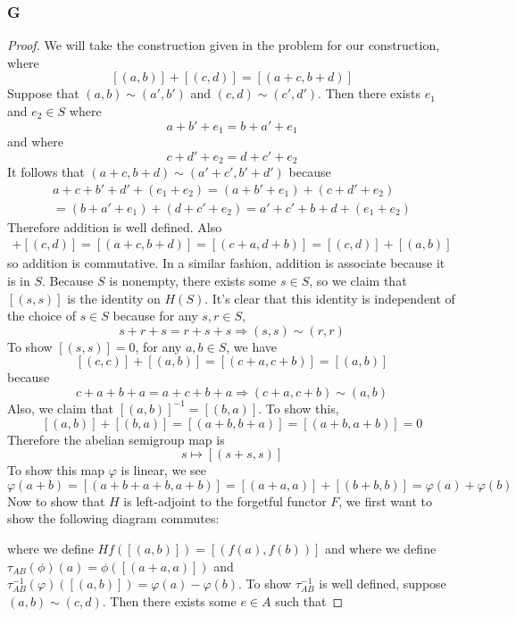 \documentclass{article}
\DeclareMathOperator{\Hom}{Hom}
\DeclareMathOperator{\Mor}{Mor}
\begin{document}
\subsubsection{G}\label{1.5.G}
\begin{proof}
    We will take the construction given in the problem for our construction, where
    \[
    [(a,b)]+[(c,d)]=[(a+c,b+d)]
    \]
    Suppose that $(a,b)\sim (a',b')$ and $(c,d)\sim (c',d')$. Then there exists $e_1$ and $e_2\in S$ where
    \[
    a+b'+e_1=b+a'+e_1
    \]
    and where
    \[
    c+d'+e_2=d+c'+e_2
    \]
    It follows that $(a+c,b+d)\sim (a'+c',b'+d')$ because 
    \begin{align*}
        a+c+b'+d'+(e_1+e_2)=(a+b'+e_1)+(c+d'+e_2)\\
        =(b+a'+e_1)+(d+c'+e_2)=a'+c'+b+d+(e_1+e_2)
    \end{align*}
    Therefore addition is well defined. Also
    \begin{align*}
        [(a,b)]+[(c,d)]=[(a+c,b+d)]=[(c+a,d+b)]=[(c,d)]+[(a,b)]
    \end{align*}
    so addition is commutative. In a similar fashion, addition is associate because it is in $S$. Because $S$ is nonempty, there exists some $s\in S$, so we claim that $[(s,s)]$ is the identity on $H(S)$. It's clear that this identity is independent of the choice of $s\in S$ because for any $s,r\in S$,
    \[
    s+r+s=r+s+s\Rightarrow (s,s)\sim(r,r)
    \]
    To show $[(s,s)]=0$, for any $a,b\in S$, we have
    \[
    [(c,c)]+[(a,b)]=[(c+a,c+b)]=[(a,b)]
    \]
    because 
    \[
    c+a+b+a=a+c+b+a\Rightarrow (c+a,c+b)\sim (a,b)
    \]
    Also, we claim that $[(a,b)]^{-1}=[(b,a)]$. To show this,
    \[
    [(a,b)]+[(b,a)]=[(a+b,b+a)]=[(a+b,a+b)]=0
    \]
    Therefore the abelian semigroup map is
    \[
    s\mapsto [(s+s,s)]
    \]
    To show this map $\varphi$ is linear, we see
    \[
    \varphi(a+b)=[(a+b+a+b,a+b)]=[(a+a,a)]+[(b+b,b)]=\varphi(a)+\varphi(b)
    \]
    Now to show that $H$ is left-adjoint to the forgetful functor $F$, we first want to show the following diagram commutes:
    \begin{center}
    \end{center}
     where we define $Hf([(a,b)])=[(f(a),f(b))]$ and where we define $\tau_{AB}(\phi)(a)=\phi([(a+a,a)])$ and $\tau_{AB}^{-1}(\varphi)([(a,b)])=\varphi(a)-\varphi(b)$. To show $\tau_{AB}^{-1}$ is well defined, suppose $(a,b)\sim (c,d)$. Then there exists some $e\in A$ such that

\end{proof}
\end{document}
